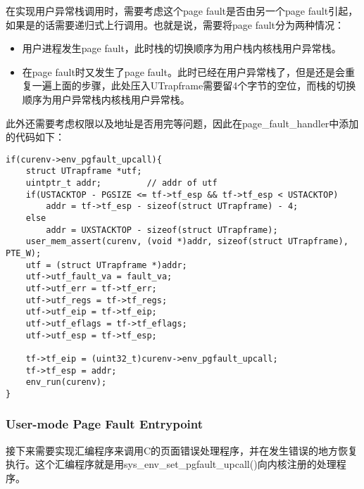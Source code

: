 \begin{exerciseSolution}{9}
    \par 在实现用户异常栈调用时，需要考虑这个page fault是否由另一个page fault引起，如果是的话需要递归式上行调用。也就是说，需要将page fault分为两种情况：
    \begin{itemize}
        \item 用户进程发生page fault，此时栈的切换顺序为用户栈\textrightarrow 内核栈\textrightarrow 用户异常栈。
        \item 在page fault时又发生了page fault。此时已经在用户异常栈了，但是还是会重复一遍上面的步骤，此处压入UTrapframe需要留4个字节的空位，而栈的切换顺序为用户异常栈\textrightarrow 内核栈\textrightarrow 用户异常栈。
    \end{itemize}
    \par 此外还需要考虑权限以及地址是否用完等问题，因此在page\_fault\_handler中添加的代码如下：

    \begin{lstlisting}
if(curenv->env_pgfault_upcall){
    struct UTrapframe *utf;
    uintptr_t addr;         // addr of utf
    if(USTACKTOP - PGSIZE <= tf->tf_esp && tf->tf_esp < USTACKTOP)
        addr = tf->tf_esp - sizeof(struct UTrapframe) - 4;
    else
        addr = UXSTACKTOP - sizeof(struct UTrapframe);
    user_mem_assert(curenv, (void *)addr, sizeof(struct UTrapframe), PTE_W);
    utf = (struct UTrapframe *)addr;
    utf->utf_fault_va = fault_va;
    utf->utf_err = tf->tf_err;
    utf->utf_regs = tf->tf_regs;
    utf->utf_eip = tf->tf_eip;
    utf->utf_eflags = tf->tf_eflags;
    utf->utf_esp = tf->tf_esp;

    tf->tf_eip = (uint32_t)curenv->env_pgfault_upcall;
    tf->tf_esp = addr;
    env_run(curenv);
}
    \end{lstlisting}
\end{exerciseSolution}

\subsubsection{User-mode Page Fault Entrypoint}
\par 接下来需要实现汇编程序来调用C的页面错误处理程序，并在发生错误的地方恢复执行。这个汇编程序就是用sys\_env\_set\_pgfault\_upcall()向内核注册的处理程序。

